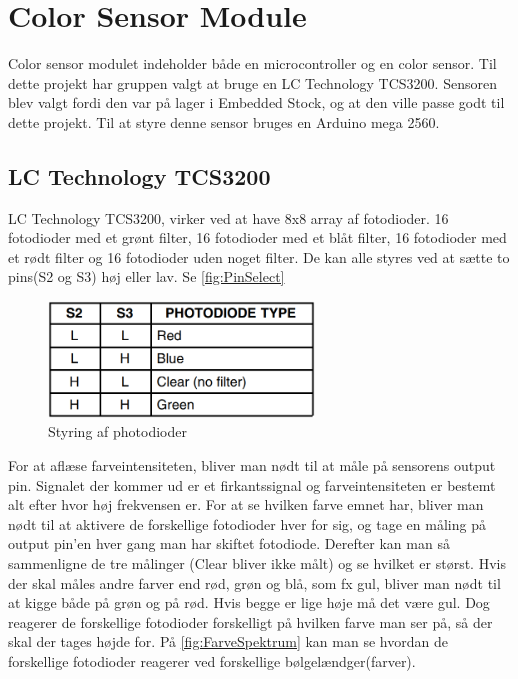 \graphicspath{{Chapters/Teori/}}


\section{Color Sensor Module}
Color sensor modulet indeholder både en microcontroller og en color sensor. Til dette projekt har gruppen valgt at bruge en LC Technology TCS3200. Sensoren blev valgt fordi den var på lager i Embedded Stock, og at den ville passe godt til dette projekt. Til at styre denne sensor bruges en Arduino mega 2560.

\subsection{LC Technology TCS3200}
LC Technology TCS3200, virker ved at have 8x8 array af fotodioder. 16 fotodioder med et grønt filter, 16 fotodioder med et blåt filter, 16 fotodioder med et rødt filter og 16 fotodioder uden noget filter. De kan alle styres ved at sætte to pins(S2 og S3) høj eller lav. Se \autoref{fig:PinSelect}

\begin{figure}[H]
	\centering
	\includegraphics[width = 200pt]{Img/S1S2_color.png}
	\caption{Styring af photodioder}
	\label{fig:PinSelect}
\end{figure}

For at aflæse farveintensiteten, bliver man nødt til at måle på sensorens output pin. Signalet der kommer ud er et firkantssignal og farveintensiteten er bestemt alt efter hvor høj frekvensen er. For at se hvilken farve emnet har, bliver man nødt til at aktivere de forskellige fotodioder hver for sig, og tage en måling på output pin'en hver gang man har skiftet fotodiode. Derefter kan man så sammenligne de tre målinger (Clear bliver ikke målt) og se hvilket er størst. Hvis der skal måles andre farver end rød, grøn og blå, som fx gul, bliver man nødt til at kigge både på grøn og på rød. Hvis begge er lige høje må det være gul. Dog reagerer de forskellige fotodioder forskelligt på hvilken farve man ser på, så der skal der tages højde for. På \autoref{fig:FarveSpektrum} kan man se hvordan de forskellige fotodioder reagerer ved forskellige bølgelændger(farver).

